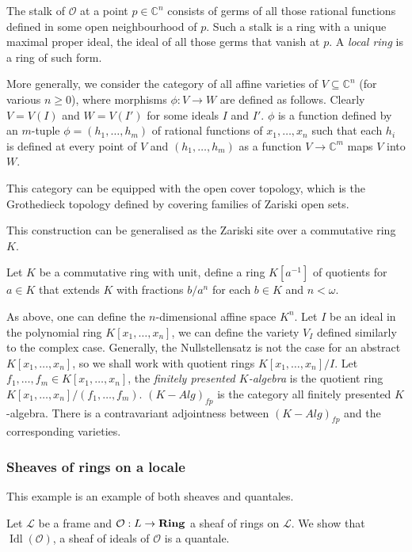 \documentclass[a4paper]{article}
\theoremstyle{defin}
\theoremstyle{theorem}
\theoremstyle{claim}
\theoremstyle{prop}
\theoremstyle{lemma}
\theoremstyle{fact}
\theoremstyle{ex}
\theoremstyle{col}
\begin{document}
The stalk of $\mathcal{O}$ at a point $p \in \mathbb{C}^n$ consists of germs of all those rational functions defined in some open neighbourhood of $p$. Such a stalk is a ring with a unique maximal proper ideal, the ideal of all those germs that vanish at $p$. A \emph{local ring} is a ring of such form.

More generally, we consider the category of all affine varieties of $V \subseteq \mathbb{C}^n$ (for various $n \geq 0$), where morphisms $\phi : V \to W$ are defined as follows. Clearly $V = V(I)$ and $W = V(I')$ for some ideals $I$ and $I'$. $\phi$ is a function defined by an $m$-tuple $\phi = (h_1, \dots, h_m)$ of rational functions of $x_1, \dots, x_n$ such that each $h_i$ is defined at every point of $V$ and $(h_1, \dots, h_m)$ as a function $V \to \mathbb{C}^m$ maps $V$ into $W$.

This category can be equipped with the open cover topology, which is the Grothedieck topology defined by covering families of Zariski open sets.

This construction can be generalised as the Zariski site over a commutative ring $K$.

Let $K$ be a commutative ring with unit, define a ring $K[a^{-1}]$ of quotients for $a \in K$ that extends $K$ with fractions $b/a^n$ for each $b \in K$ and $n < \omega$.

As above, one can define the $n$-dimensional affine space $K^n$. Let $I$ be an ideal in the polynomial ring $K[x_1, \dots, x_n]$, we can define the variety $V_I$ defined similarly to the complex case. Generally, the Nullstellensatz is not the case for an abstract $K[x_1, \dots, x_n]$, so we shall work with quotient rings $K[x_1, \dots, x_n]/I$. Let $f_1, \dots, f_m \in K[x_1, \dots, x_n]$, the \emph{finitely presented $K$-algebra} is the quotient ring $K[x_1, \dots, x_n]/(f_1, \dots, f_m)$. $(K - Alg)_{fp}$ is the category all finitely presented $K$-algebra. There is a contravariant adjointness between $(K - Alg)_{fp}$ and the corresponding varieties.

\subsubsection{Sheaves of rings on a locale}

This example is an example of both sheaves and quantales.

Let $\mathcal{L}$ be a frame and $\mathcal{O} : L \to {\bf Ring}$ a sheaf of rings on $\mathcal{L}$. We show that $\operatorname{Idl}(\mathcal{O})$, a sheaf of ideals of $\mathcal{O}$ is a quantale.
\end{document}
